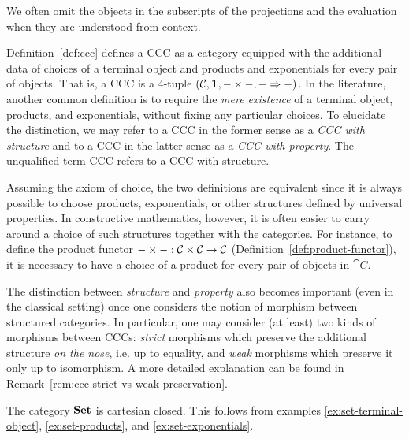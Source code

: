 We often omit the objects in the subscripts of the projections and the evaluation when they are understood from context.

\begin{rem} \label{rem:ccc-structure-vs-property}
Definition~\ref{def:ccc} defines a CCC as a category equipped with the additional data of choices of a terminal object and products and exponentials for every pair of objects. That is, a CCC is a 4-tuple $(\mathcal{C}, \mathbf{1}_{}, - \times -, - \Rightarrow -)$. In the literature, another common definition is to require the \textit{mere existence} of a terminal object, products, and exponentials, without fixing any particular choices. To elucidate the distinction, we may refer to a CCC in the former sense as a \emph{CCC with structure} and to a CCC in the latter sense as a \emph{CCC with property}. The unqualified term CCC refers to a CCC with structure.

Assuming the axiom of choice, the two definitions are equivalent since it is always possible to choose products, exponentials, or other structures defined by universal properties. In constructive mathematics, however, it is often easier to carry around a choice of such structures together with the categories. For instance, to define the product functor $- \times - : \mathcal{C} \times \mathcal{C} \to \mathcal{C}$ (Definition~\ref{def:product-functor}), it is necessary to have a choice of a product for every pair of objects in $\cat{C}$.

The distinction between \textit{structure} and \textit{property} also becomes important (even in the classical setting) once one considers the notion of morphism between structured categories. In particular, one may consider (at least) two kinds of morphisms between CCCs: \textit{strict} morphisms which preserve the additional structure \textit{on the nose}, i.e. up to equality, and \textit{weak} morphisms which preserve it only up to isomorphism. A more detailed explanation can be found in Remark~\ref{rem:ccc-strict-vs-weak-preservation}.
\end{rem}

\begin{ex} \label{ex:set-is-ccc}
The category $\mathbf{Set}$ is cartesian closed. This follows from examples \ref{ex:set-terminal-object}, \ref{ex:set-products}, and \ref{ex:set-exponentials}.
\end{ex}

